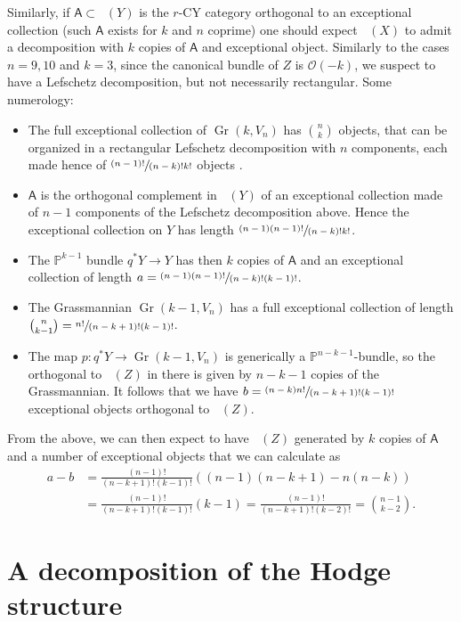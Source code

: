 \documentclass[JEP,XML,SOM,Unicode,NoEqCountersInSection]{cedram}
\let\mathcal\mathscr
\theoremstyle{plain}
\theoremstyle{definition}
\newcommand{\cat}[1]{\mathsf{#1}}
\DeclareMathOperator{\Db}{{\cat{D}^{\mathrm{b}}}}
\DeclareMathOperator{\Gr}{Gr}
\newcommand{\PP}{\mathbb{P}}
\newcommand{\sheaf}[1]{\mathcal{#1}}
\newcommand{\ko}{\sheaf{O}}\let\OO\ko\let\cO\ko
\begin{document}
Similarly, if $\cat{A} \subset \Db(Y)$ is the $r$-CY category orthogonal to an
exceptional collection (such $\cat{A}$ exists for $k$ and $n$ coprime) one should
expect $\Db(X)$ to admit a decomposition with $k$ copies of $\cat{A}$ and exceptional
object. Similarly to the cases $n=9,10$ and $k=3$, since the canonical bundle of $Z$
is $\ko(-k)$, we suspect to have a Lefschetz decomposition, but not necessarily
rectangular. Some numerology:

\begin{itemize}
\item The full exceptional collection of $\Gr(k,V_n)$ has $\binom{n}{k}$ objects,
that can be organized in a rectangular Lefschetz decomposition with $n$ components, each made
hence of $\sfrac{(n-1)!}{(n-k)!k!}$ objects \cite[Cor.\,4.4]{kuz-fractional}.
\item $\cat{A}$ is the orthogonal complement in $\Db(Y)$ of an exceptional collection
made of $n-1$ components of the Lefschetz decomposition above. Hence the exceptional collection
on $Y$ has length $\sfrac{(n-1)(n-1)!}{(n-k)!k!}$.
\item The $\PP^{k-1}$ bundle $q^*Y \to Y$ has then $k$ copies of $\cat{A}$ and an exceptional
collection of length $a=\sfrac{(n-1)(n-1)!}{(n-k)!(k-1)!}$.
\item The Grassmannian $\Gr(k-1,V_n)$ has a full exceptional collection of length
$\binom{n}{k-1}=\sfrac{n!}{(n-k+1)!(k-1)!}$.
\item The map $p:q^*Y \to \Gr(k-1,V_n)$ is generically a $\PP^{n-k-1}$-bundle, so
the orthogonal to $\Db(Z)$ in there is given by $n-k-1$ copies of the Grassmannian. It
follows that we have $b=\sfrac{(n-k)n!}{(n-k+1)!(k-1)!}$ exceptional objects orthogonal
to $\Db(Z)$.
\end{itemize}

From the above, we can then expect to have $\Db(Z)$ generated by $k$ copies of $\cat{A}$
and a number of exceptional objects that we can calculate as
\begin{align*}
a-b&=\frac{(n-1)!}{(n-k+1)!(k-1)!}((n-1)(n-k+1)-n(n-k))\\[-2pt]
&=\frac{(n-1)!}{(n-k+1)!(k-1)!}(k-1)= \frac{(n-1)!}{(n-k+1)!(k-2)!} = \binom{n-1}{k-2}.
\end{align*}
\appendix

\section{A decomposition of the Hodge structure}\label{sec:hodgedeco}
\end{document}
